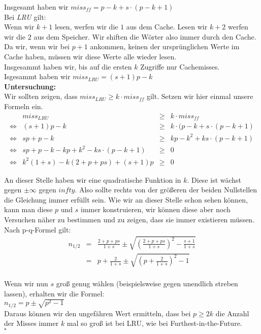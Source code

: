 \documentclass[11pt,a4paper,ngerman]{article}
\begin{document}
\begin{enumerate}[\bfseries (a)]
Insgesamt haben wir $miss_{ff} = p - k + s \cdot (p - k + 1)$ \\

Bei \emph{LRU} gilt:\\
Wenn wir $k+1$ lesen, werfen wir die $1$ aus dem Cache. Lesen wir $k+2$ werfen wir die $2$ aus dem Speicher. Wir shiften die Wörter also immer durch den Cache. Da wir, wenn wir bei $p+1$ ankommen, keinen der ursprünglichen Werte im Cache haben, müssen wir diese Werte alle wieder lesen.\\
Insgesammt haben wir, bis auf die ersten $k$ Zugriffe nur Cachemisses.\\

Isgesammt haben wir $miss_{LRU} = (s+1)p - k$\\

\textbf{Untersuchung:}\\
Wir sollten zeigen, dass $miss_{LRU} \geq k \cdot miss_{ff}$ gilt. Setzen wir hier einmal unsere Formeln ein.
$$
\begin{array}{crcl}
& miss_{LRU} &\geq& k \cdot miss_{ff}\\
\Leftrightarrow & (s+1)p - k &\geq& k \cdot (p - k + s \cdot (p - k + 1)\\
\Leftrightarrow & sp + p - k &\geq&  kp - k^2 +ks \cdot (p - k + 1)\\
\Leftrightarrow & sp + p - k - kp + k^2 - ks \cdot ( p - k + 1) & \geq & 0\\
\Leftrightarrow & k^2 (1 + s) - k (2 + p + ps) +(s+1)p & \geq & 0
\end{array}
$$

An dieser Stelle haben wir eine quadratische Funktion in $k$. Diese ist wächst gegen $\pm \infty$ gegen $infty$. Also sollte rechts von der größeren der beiden Nullstellen die Gleichung immer erfüllt sein. Wie wir an dieser Stelle schon sehen können, kann man diese $p$ und $s$ immer konstruieren, wir können diese aber noch Versuchen näher zu bestimmen und zu zeigen, dass sie immer existieren müssen.\\
Nach p-q-Formel gilt:\\

$$
\begin{array}{rcl}
n_{1/2} &=& \frac{2 + p + ps}{1 + s} \pm \sqrt{ \left( \frac{2 + p + ps}{1 + s} \right)^2 - \frac{s+1}{1+s}}\\
&=& p + \frac{2}{1 + s} \pm \sqrt{ \left( p + \frac{2}{1 + s} \right)^2 - 1}\\
\end{array}
$$

Wenn wir nun $s$ groß genug wählen (beispielsweise gegen unendlich streben lassen), erhalten wir die Formel:\\
$n_{1/2} = p \pm \sqrt{p^2 - 1}$\\

Daraus können wir den ungefähren Wert ermitteln, dass bei $p\geq 2k$ die Anzahl der Misses immer $k$ mal so groß ist bei LRU, wie bei Furthest-in-the-Future.\\
\mbox{} \hfill $\square$
\end{enumerate}
\end{document}

